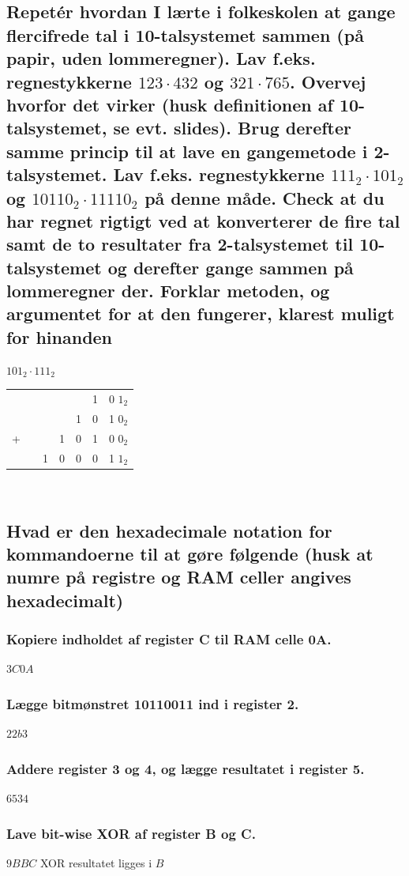 \documentclass[12pt, a4paper]{article}
\begin{document}
				\subsection{Repetér hvordan I lærte i folkeskolen at gange flercifrede tal i 10-talsystemet sammen (på papir, uden lommeregner). Lav f.eks. regnestykkerne $123\cdot 432$ og $321\cdot 765$. Overvej hvorfor det virker (husk definitionen af 10-talsystemet, se evt. slides). Brug derefter samme princip til at lave en gangemetode i 2-talsystemet. Lav f.eks. regnestykkerne $111_2 \cdot 101_2$ og $10110_2 \cdot 11110_2$ på denne måde. Check at du har regnet rigtigt ved at konverterer de fire tal samt de to resultater fra 2-talsystemet til 10-talsystemet og derefter gange sammen på lommeregner der. Forklar metoden, og argumentet for at den fungerer, klarest muligt for hinanden}
					$101_2\cdot 111_2$
					\begin{tabular}{ccccccc}
					  &  &  &  & & 1 & 0 $1_2$ \\
					 &  & & & 1 & 0 & 1 $0_2$\\
					+ &  & & 1 & 0 & 1 & 0 $0_2$\\
					\hline
					 &  & 1 & 0 & 0 & 0 &1  $1_2$ \\
					\end{tabular}\
				\subsection{Hvad er den hexadecimale notation for kommandoerne til at gøre følgende (husk at numre på registre og RAM celler angives hexadecimalt)}
					\subsubsection{Kopiere indholdet af register C til RAM celle 0A.}
						$3C0A$	
					\subsubsection{Lægge bitmønstret 10110011 ind i register 2.}
						$22b3$
					\subsubsection{Addere register 3 og 4, og lægge resultatet i register 5.}
						$6534$
					\subsubsection{Lave bit-wise XOR af register B og C.}
						$9BBC$ XOR resultatet ligges i $B$
\end{document}
